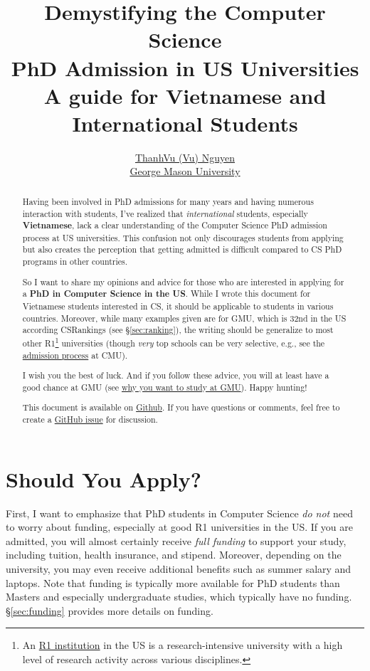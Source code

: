 \documentclass[11pt]{article}
\title{Demystifying the Computer Science \\PhD Admission in US Universities\\{\large A guide for Vietnamese and International Students}}
\author{\small \href{https://nguyenthanhvuh.github.io}{ThanhVu (Vu) Nguyen}\\
\href{https://cs.gmu.edu}{George Mason University}}
\begin{document}
\maketitle

\begin{abstract}
Having been involved in PhD admissions for many years and having
numerous interaction with  students, I've
realized that \emph{international} students, especially \textbf{Vietnamese}, lack a clear understanding of
the Computer Science PhD admission process at US universities. This confusion not only
discourages students from applying but also creates the perception that
getting admitted is difficult compared to CS PhD programs in other countries.

So I want to share my opinions and advice for those who are interested in applying for a \textbf{PhD in Computer Science in the US}.
While I wrote this document for Vietnamese students interested in CS, it should be applicable to students in various countries.
Moreover, while many examples given are for GMU, which is 32nd in the US according CSRankings (see \S\ref{sec:ranking}), the writing should be generalize to most other R1\footnote{An \href{https://en.wikipedia.org/wiki/List_of_research_universities_in_the_United_States}{R1 institution} in the US is a research-intensive university with a high level of research activity across various disciplines.} universities  (though \emph{very} top schools can be very selective, e.g., see the \href{https://da-data.blogspot.com/2015/03/reflecting-on-cs-graduate-admissions.html}{admission process} at CMU).

I wish you the best of luck. And if you follow these advice,
you will at least have a good chance at GMU (see
\href{https://github.com/dynaroars/dynaroars.github.io/wiki/About-GMU}{why
you want to study at GMU}). Happy hunting!

This document is available on \href{https://github.com/nguyenthanhvuh/phd-cs-us}{Github}. If you have questions or comments, feel free to create a \href{https://github.com/nguyenthanhvuh/phd-cs-us/issues}{GitHub issue} for discussion.
\end{abstract}

\section{Should You Apply?}

First, I want to emphasize that PhD students in Computer
Science \emph{do not} need to worry about funding, especially at good R1
universities in the US. If you are admitted, you will almost certainly
receive \emph{full funding} to support your study, including tuition,
health insurance, and stipend. Moreover, depending on the university,
you may even receive additional benefits such as summer salary and laptops. Note that
funding is typically more available for PhD students than 
Masters and especially undergraduate studies, which typically have no funding. \S\ref{sec:funding} provides more details on funding.
\end{document}
